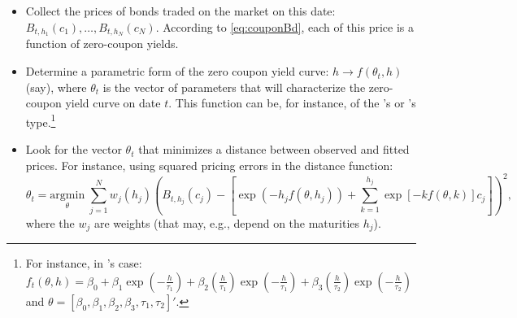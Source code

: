 \documentclass[
  12pt,
]{book}
\providecommand{\tightlist}{%
  \setlength{\itemsep}{0pt}\setlength{\parskip}{0pt}}
\theoremstyle{definition}
\theoremstyle{definition}
\theoremstyle{definition}
\theoremstyle{definition}
\theoremstyle{remark}
\begin{document}
\begin{itemize}
\tightlist
\item
  Collect the prices of bonds traded on the market on this date: \(B_{t,h_1}(c_1),\dots,B_{t,h_N}(c_N)\). According to \eqref{eq:couponBd}, each of this price is a function of zero-coupon yields.
\item
  Determine a parametric form of the zero coupon yield curve: \(h \rightarrow f(\theta_t,h)\) (say), where \(\theta_t\) is the vector of parameters that will characterize the zero-coupon yield curve on date \(t\). This function can be, for instance, of the \citet{Nelson_Siegel_1987}'s or \citet{Svensson_1994}'s type.\footnote{For instance, in \citet{Svensson_1994}'s case: \(f_t(\theta,h) = \beta_0 + \beta_1 \exp\left(-\frac{h}{\tau_1}\right) + \beta_2 \left(\frac{h}{\tau_1}\right) \exp\left(-\frac{h}{\tau_1}\right) + \beta_3 \left(\frac{h}{\tau_2}\right) \exp\left(-\frac{h}{\tau_2}\right)\) and \(\theta = [\beta_0,\beta_1,\beta_2,\beta_3,\tau_1,\tau_2]'\).}
\item
  Look for the vector \(\theta_t\) that minimizes a distance between observed and fitted prices. For instance, using squared pricing errors in the distance function:
  \[
  \theta_t = \underset{\theta}{\mbox{argmin}}\;  \sum_{j=1}^N w_j(h_j)\left(B_{t,h_j}(c_j) - \left[\exp(-h_j f(\theta,h_j)) + \sum_{k=1}^{h_j} \exp\left[-k f(\theta,k)\right]c_j\right]\right)^2,
  \]
  where the \(w_j\) are weights (that may, e.g., depend on the maturities \(h_j\)).
\end{itemize}
\end{document}
